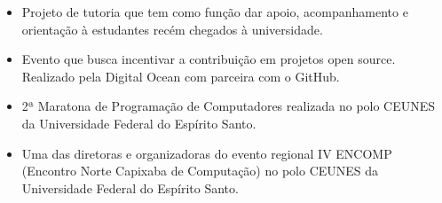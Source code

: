 \begin{itemize}
\item Projeto de tutoria que tem como função dar apoio, acompanhamento e orientação à estudantes recém chegados à universidade.
\end{itemize}
\smallskip
{}
\begin{itemize}
\item Evento que busca incentivar a contribuição em projetos open source. Realizado pela Digital Ocean com parceira com o GitHub.
\end{itemize}
\smallskip
{}
\begin{itemize}
\item 2ª Maratona de Programação de Computadores realizada no polo CEUNES da Universidade Federal do Espírito Santo.
\end{itemize}
\smallskip
{}
\begin{itemize}
\item Uma das diretoras e organizadoras do evento regional IV ENCOMP (Encontro Norte Capixaba de Computação) no polo CEUNES da Universidade Federal do Espírito Santo.
\end{itemize}
\smallskip
\cvproject{}
